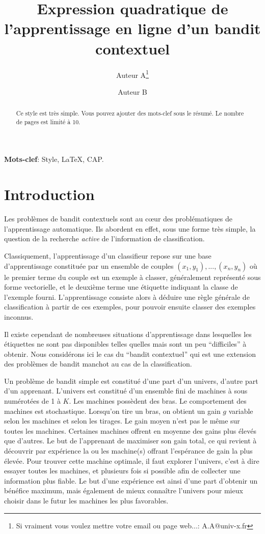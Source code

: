 \documentclass[twocolumn]{article}
\title{Expression quadratique de l'apprentissage en ligne d'un bandit contextuel}
\author[1]{Auteur A\thanks{Si vraiment vous voulez mettre votre email
    ou page web...: A.A@univ-x.fr}}
\author[2]{Auteur B}
\affil[1]{Université X, CNRS}
\affil[2]{Université Y, CNRS et INRIA}
\begin{document}
\maketitle

\begin{abstract}
  Ce style est très simple. Vous pouvez ajouter des mots-clef sous le
  résumé. Le nombre de pages est limité à 10. 
\end{abstract}

\medskip

\noindent\textbf{Mots-clef}: Style, \LaTeX, CAP.

\section{Introduction}
\label{sec:lentete}

Les problèmes de bandit contextuels sont au cœur des problématiques de l’apprentissage automatique. Ils abordent en effet, sous une forme très simple, la question de la recherche \emph{active} de l'information de classification. 

Classiquement, l'apprentissage d'un classifieur repose sur une base d'apprentissage constituée par un ensemble de couples $(x_1,y_1),..., (x_n,y_n)$ où le premier terme du couple est un exemple à classer, généralement représenté sous forme vectorielle,  et le deuxième terme une étiquette indiquant la classe de l'exemple fourni.
L'apprentissage consiste alors à déduire une règle générale de classification à partir de ces exemples, pour pouvoir ensuite classer des exemples inconnus.

Il existe cependant de nombreuses situations d'apprentissage dans lesquelles les étiquettes ne sont pas disponibles telles quelles mais sont un peu ``difficiles'' à obtenir. Nous considérons ici le cas du ``bandit contextuel'' qui est une extension des problèmes de bandit manchot au cas de la classification. 

Un problème de bandit simple est constitué d'une part d'un univers,  d'autre part d'un apprenant. L'univers est constitué d'un ensemble fini de machines à sous numérotées de 1 à $K$. Les machines possèdent des bras. Le comportement des machines est stochastique. Lorsqu'on tire un bras, on obtient un gain $g$ variable selon les machines et selon les tirages. Le gain moyen n'est pas le même sur toutes les machines. Certaines machines offrent en moyenne des gains plus élevés que d'autres. Le but de l'apprenant de maximiser son gain total, ce qui revient à découvrir par expérience la ou les machine(s) offrant l'espérance de gain la plus élevée. Pour trouver cette machine optimale, il faut explorer l'univers, c'est à dire essayer toutes les machines, et plusieurs fois si possible afin de collecter une information plus fiable. Le but d'une expérience est ainsi d'une part d'obtenir un bénéfice maximum, mais également de mieux connaître l'univers pour mieux choisir dans le futur les machines les plus favorables. 
\end{document}
